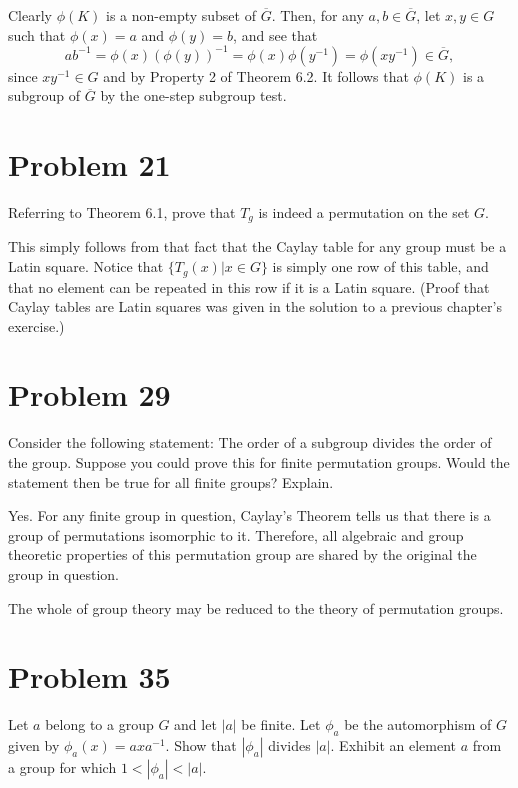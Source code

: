 \documentclass[12pt]{article}
\begin{document}
Clearly $\phi(K)$ is a non-empty subset of $\overline{G}$.
Then, for any $a,b\in\overline{G}$, let $x,y\in G$ such that $\phi(x)=a$ and $\phi(y)=b$,
and see that
\begin{equation*}
ab^{-1}=\phi(x)(\phi(y))^{-1}=\phi(x)\phi(y^{-1})=\phi(xy^{-1})\in\overline{G},
\end{equation*}
since $xy^{-1}\in G$ and by Property 2 of Theorem 6.2.  It follows that
$\phi(K)$ is a subgroup of $\overline{G}$ by the one-step subgroup test.

\section*{Problem 21}

Referring to Theorem 6.1, prove that $T_g$ is indeed a permutation on the set $G$.

This simply follows from that fact that the Caylay table for any group must be a Latin square.
Notice that $\{T_g(x)|x\in G\}$ is simply one row of this table, and that no element can be
repeated in this row if it is a Latin square.  (Proof that Caylay tables are Latin squares
was given in the solution to a previous chapter's exercise.)

\section*{Problem 29}

Consider the following statement: The order of a subgroup divides the order of the group.
Suppose you could prove this for finite permutation groups.  Would the statement then be true for all
finite groups?  Explain.

Yes.  For any finite group in question, Caylay's Theorem tells us that there
is a group of permutations isomorphic to it.  Therefore, all algebraic and group theoretic properties
of this permutation group are shared by the original the group in question.

The whole of group theory may be reduced to the theory of permutation groups.

\section*{Problem 35}

Let $a$ belong to a group $G$ and let $|a|$ be finite.  Let $\phi_a$ be the automorphism
of $G$ given by $\phi_a(x)=axa^{-1}$.  Show that $|\phi_a|$ divides $|a|$.
Exhibit an element $a$ from a group for which $1<|\phi_a|<|a|$.
\end{document}
